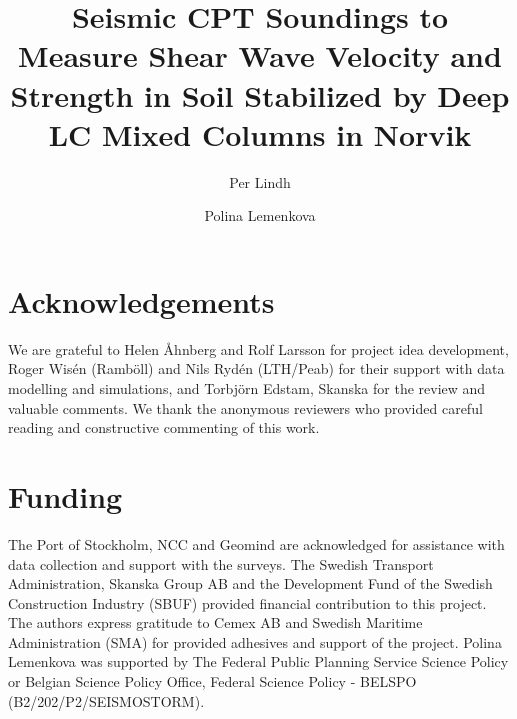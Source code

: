 \documentclass[final,3p,times,twocolumn]{elsarticle}
\begin{document}
\begin{frontmatter}

\title{Seismic CPT Soundings to Measure Shear Wave Velocity and Strength in Soil Stabilized by Deep LC Mixed Columns in Norvik}

\author[label1,label2]{Per Lindh}


\author[label3]{Polina Lemenkova}

\end{frontmatter}

\section{Acknowledgements}
We are grateful to Helen Åhnberg and Rolf Larsson for project idea development, Roger Wisén (Ramböll) and Nils Rydén (LTH/Peab) for their support with data modelling and simulations, and Torbjörn Edstam, Skanska for the review and valuable comments. We thank the anonymous reviewers who provided careful reading and constructive commenting of this work. 

\section{Funding}
The Port of Stockholm, NCC and Geomind are acknowledged for assistance with data collection and support with the surveys. The Swedish Transport Administration, Skanska Group AB and the Development Fund of the Swedish Construction Industry (SBUF) provided financial contribution to this project. The authors express gratitude to Cemex AB and Swedish Maritime Administration (SMA) for provided adhesives and support of the project. Polina Lemenkova was supported by The Federal Public Planning Service Science Policy or Belgian Science Policy Office, Federal Science Policy - BELSPO (B2/202/P2/SEISMOSTORM).
\end{document}
